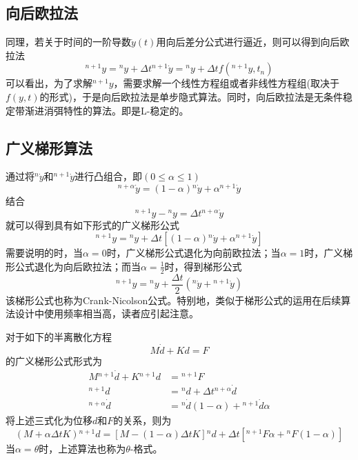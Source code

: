 \subsection{向后欧拉法}
同理，若关于时间的一阶导数$\dot{y}(t)$用向后差分公式进行逼近，则可以得到向后欧拉法
\begin{equation}
{^{n+1}\!y}={^n\!y}+\Delta t{^{n+1}\!\dot{y}}={^n\!y}+\Delta tf({^{n+1}\!y},t_n)
\end{equation}
可以看出，为了求解${^{n+1}\!y}$，需要求解一个线性方程组或者非线性方程组(取决于$f(y,t)$的形式)，于是向后欧拉法是单步隐式算法。同时，向后欧拉法是无条件稳定带渐进消弭特性的算法。即是L-稳定的。
\subsection{广义梯形算法}
通过将${^n\!\dot{y}}$和${^{n+1}\!\dot{y}}$进行凸组合\cite{book:dover,Wood}，即$(0\le\alpha\le1)$
\begin{equation}
{^{n+\alpha}\!\dot{y}}=(1-\alpha){^n\!\dot{y}}+\alpha{^{n+1}\!\dot{y}}
\end{equation}
结合
\begin{equation}
{^{n+1}\!y}-{^n\!y}=\Delta t{^{n+\alpha}\!\dot{y}}
\end{equation}
就可以得到具有如下形式的广义梯形公式
\begin{equation}
{^{n+1}\!y}={^n\!y}+\Delta t[(1-\alpha){^n\!\dot{y}}+\alpha{^{n+1}\!\dot{y}}]
\end{equation}
需要说明的时，当$\alpha=0$时，广义梯形公式退化为向前欧拉法；当$\alpha=1$时，广义梯形公式退化为向后欧拉法；而当$\alpha=\frac12$时，得到梯形公式
\begin{equation}
{^{n+1}\!y}={^n\!y}+\frac{\Delta t}{2}({^n\!\dot{y}}+{^{n+1}\!\dot{y}})
\end{equation}
该梯形公式也称为Crank-Nicolson公式。特别地，类似于梯形公式的运用在后续算法设计中使用频率相当高，读者应引起注意。

对于如下的半离散化方程
\begin{equation}
M\dot{d}+Kd=F
\end{equation}
的广义梯形公式形式为
\begin{align}
M{^{n+1}\!\dot{d}}+K{^{n+1}\!d}&={^{n+1}\!F}\\
{^{n+1}\!d}&={^n\!d}+\Delta t{^{n+\alpha}\!\dot{d}}\\
{^{n+\alpha}\!\dot{d}}&={^n\!\dot{d}}(1-\alpha)+{^{n+1}\!\dot{d}}\alpha
\end{align}
将上述三式化为位移$d$和$F$的关系，则为
\begin{equation}
(M+\alpha\Delta tK){^{n+1}\!d}=[M-(1-\alpha)\Delta tK]{^n\!d}+\Delta t[{^{n+1}\!F}\alpha+{^n\!F}(1-\alpha)]
\end{equation}
当$\alpha=\theta$时，上述算法也称为$\theta$-格式\cite{Wood}。
